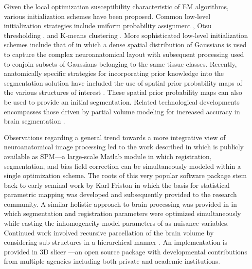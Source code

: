 \documentclass[11pt,english]{article}
\begin{document}
Given the local optimization susceptibility characteristic of EM algorithms, various initialization schemes have been proposed.  Common low-level initialization strategies include uniform
probability assignment \citep{Wells1996}, Otsu thresholding \citep{Zhang2001}, and K-means clustering \citep{Pappas1992}.  More sophisticated low-level initialization schemes include that of \cite{Greenspan2006} in which a dense spatial distribution of Gaussians is used to capture the complex neuroanatomical layout with subsequent processing used to conjoin subsets of Gaussians belonging to the same tissue classes.  Recently, anatomically specific strategies for incorporating prior knowledge  into the segmentation solution have included the use of spatial prior probability maps  of the various structures of interest \citep{Leemput1999a,Marroquin2002,Ashburner2005}.  These spatial prior probability maps can also be used to provide an
initial segmentation.   Related technological developments encompasses
those driven by partial volume modeling for increased accuracy in
brain segmentation \citep{Ruan2000,Ballester2002,Leemput2003}.  

Observations regarding a general trend towards a more integrative view 
of neuroanatomical image processing led to the work described in \cite{Ashburner2005} which is
publicly available as SPM---a large-scale Matlab module in which registration, segmentation, and bias field 
correction can be simultaneously modeled within a single optimization scheme. The roots of this very popular 
software package stem back to early seminal work by Karl Friston in which the basis for statistical parametric mapping was developed \citep{Friston1990} and subsequently provided to the research community. A similar holistic approach
to brain processing was provided in \cite{Pohl2006} in which segmentation
and registration parameters were optimized simultaneously while casting the inhomogeneity model parameters
of \cite{Wells1996} as nuisance variables.  Continued work involved recursive parcellation of the brain volume by considering sub-structures in a hierarchical manner \citep{Pohl2007}.  An implementation is provided in  3D slicer \cite{Pieper2006}---an open source package with developmental contributions from multiple agencies including both private and academic institutions.
\end{document}
